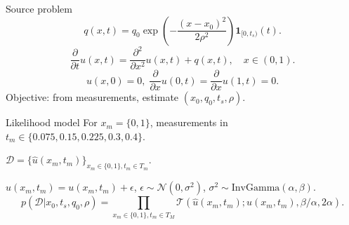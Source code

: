 \documentclass{beamer}
\begin{document}
\begin{frame}
\begin{block}{}
\begin{figure}
\centering
\captionsetup[subfigure]{labelformat=empty}
\end{figure}
\end{block}
\end{frame}
\begin{frame}
\begin{block}{Source problem}
\begin{equation*}
q(x,t) = q_0 \exp \left(-\frac{(x-x_0)^2}{2 \rho^2} \right) \mathbf{1}_{[0,t_s)}(t).
\end{equation*}
\begin{equation*}
\frac{\partial}{\partial t} u(x,t) = \frac{\partial^2}{\partial x^2} u(x,t) + q(x,t), \quad x \in (0,1).
\end{equation*}
\begin{equation*}
u(x,0) = 0, \; \frac{\partial}{\partial x} u(0,t) = \frac{\partial}{\partial x} u(1,t) = 0.
\end{equation*}
Objective: from measurements, estimate $(x_0,q_0,t_s,\rho)$.
\end{block}
\begin{block}{Likelihood model}
For $x_m=\{0,1\}$, measurements in $t_m \in \{0.075,0.15,0.225,0.3,0.4\}$.

$\mathcal{D} = \{\hat{u}(x_m,t_m)\}_{x_m \in \{0,1\},t_m \in T_m}$.

$\hat{u}(x_m,t_m) = u(x_m,t_m) + \epsilon$, $\epsilon \sim \mathcal{N}(0,\sigma^2)$, $\sigma^2 \sim \text{InvGamma}(\alpha,\beta)$.
\begin{equation*}
p(\mathcal{D}|x_0,t_s,q_0,\rho) = \prod_{x_m \in \{0,1\},t_m \in T_M} \mathcal{T}(\hat{u}(x_m,t_m);u(x_m,t_m),\beta/\alpha,2 \alpha).
\end{equation*}
\end{block}
\end{frame}
\end{document}

